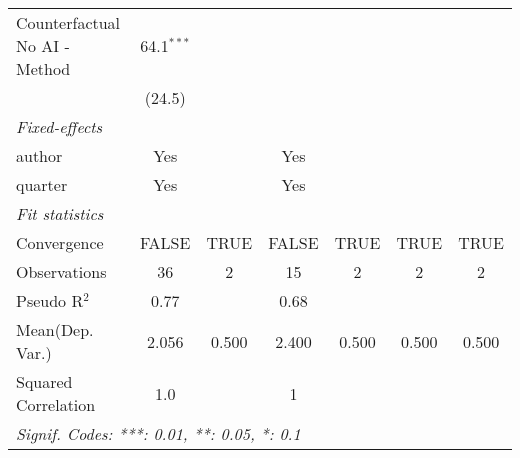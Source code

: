 \begin{tabular}{lcccccc}
   Counterfactual No AI - Method & 64.1$^{***}$  &      &              &      &      &   \\   
                                 & (24.5)        &      &              &      &      &   \\   
   \midrule
   \emph{Fixed-effects}\\
   author                        & Yes           &      & Yes          &      &      & \\  
   quarter                       & Yes           &      & Yes          &      &      & \\  
   \midrule
   \emph{Fit statistics}\\
   Convergence                   &FALSE          & TRUE & FALSE        & TRUE & TRUE & TRUE\\  
   Observations                  & 36            & 2    & 15           & 2    & 2    & 2\\  
   Pseudo R$^2$                  & 0.77          &      & 0.68         &      &      & \\  
Mean(Dep. Var.) & 2.056 & 0.500 & 2.400 & 0.500 & 0.500 & 0.500 \\
   Squared Correlation           & 1.0           &      & 1            &      &      & \\  
   \midrule \midrule
   \multicolumn{7}{l}{\emph{Signif. Codes: ***: 0.01, **: 0.05, *: 0.1}}\\
\end{tabular}
\par\endgroup

